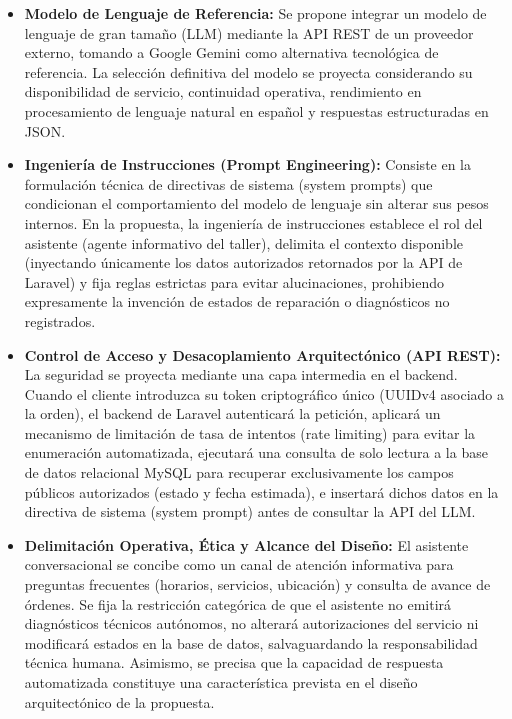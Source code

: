 \begin{itemize}
    \item \textbf{Modelo de Lenguaje de Referencia:} Se propone integrar un modelo de lenguaje de gran tamaño (LLM) mediante la API REST de un proveedor externo, tomando a Google Gemini \cite{googleai2026} como alternativa tecnológica de referencia. La selección definitiva del modelo se proyecta considerando su disponibilidad de servicio, continuidad operativa, rendimiento en procesamiento de lenguaje natural en español y respuestas estructuradas en JSON.
    \item \textbf{Ingeniería de Instrucciones (Prompt Engineering):} Consiste en la formulación técnica de directivas de sistema (system prompts) que condicionan el comportamiento del modelo de lenguaje sin alterar sus pesos internos. En la propuesta, la ingeniería de instrucciones establece el rol del asistente (agente informativo del taller), delimita el contexto disponible (inyectando únicamente los datos autorizados retornados por la API de Laravel) y fija reglas estrictas para evitar alucinaciones, prohibiendo expresamente la invención de estados de reparación o diagnósticos no registrados.
    \item \textbf{Control de Acceso y Desacoplamiento Arquitectónico (API REST):} La seguridad se proyecta mediante una capa intermedia en el backend. Cuando el cliente introduzca su token criptográfico único (UUIDv4 asociado a la orden), el backend de Laravel autenticará la petición, aplicará un mecanismo de limitación de tasa de intentos (rate limiting) para evitar la enumeración automatizada, ejecutará una consulta de solo lectura a la base de datos relacional MySQL para recuperar exclusivamente los campos públicos autorizados (estado y fecha estimada), e insertará dichos datos en la directiva de sistema (system prompt) antes de consultar la API del LLM.
    \item \textbf{Delimitación Operativa, Ética y Alcance del Diseño:} El asistente conversacional se concibe como un canal de atención informativa para preguntas frecuentes (horarios, servicios, ubicación) y consulta de avance de órdenes. Se fija la restricción categórica de que el asistente no emitirá diagnósticos técnicos autónomos, no alterará autorizaciones del servicio ni modificará estados en la base de datos, salvaguardando la responsabilidad técnica humana. Asimismo, se precisa que la capacidad de respuesta automatizada constituye una característica prevista en el diseño arquitectónico de la propuesta.

\end{itemize}
